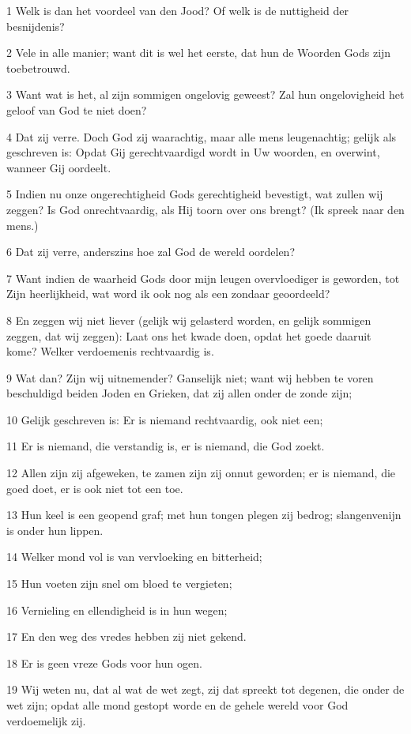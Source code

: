 \par 1 Welk is dan het voordeel van den Jood? Of welk is de nuttigheid der besnijdenis?
\par 2 Vele in alle manier; want dit is wel het eerste, dat hun de Woorden Gods zijn toebetrouwd.
\par 3 Want wat is het, al zijn sommigen ongelovig geweest? Zal hun ongelovigheid het geloof van God te niet doen?
\par 4 Dat zij verre. Doch God zij waarachtig, maar alle mens leugenachtig; gelijk als geschreven is: Opdat Gij gerechtvaardigd wordt in Uw woorden, en overwint, wanneer Gij oordeelt.
\par 5 Indien nu onze ongerechtigheid Gods gerechtigheid bevestigt, wat zullen wij zeggen? Is God onrechtvaardig, als Hij toorn over ons brengt? (Ik spreek naar den mens.)
\par 6 Dat zij verre, anderszins hoe zal God de wereld oordelen?
\par 7 Want indien de waarheid Gods door mijn leugen overvloediger is geworden, tot Zijn heerlijkheid, wat word ik ook nog als een zondaar geoordeeld?
\par 8 En zeggen wij niet liever (gelijk wij gelasterd worden, en gelijk sommigen zeggen, dat wij zeggen): Laat ons het kwade doen, opdat het goede daaruit kome? Welker verdoemenis rechtvaardig is.
\par 9 Wat dan? Zijn wij uitnemender? Ganselijk niet; want wij hebben te voren beschuldigd beiden Joden en Grieken, dat zij allen onder de zonde zijn;
\par 10 Gelijk geschreven is: Er is niemand rechtvaardig, ook niet een;
\par 11 Er is niemand, die verstandig is, er is niemand, die God zoekt.
\par 12 Allen zijn zij afgeweken, te zamen zijn zij onnut geworden; er is niemand, die goed doet, er is ook niet tot een toe.
\par 13 Hun keel is een geopend graf; met hun tongen plegen zij bedrog; slangenvenijn is onder hun lippen.
\par 14 Welker mond vol is van vervloeking en bitterheid;
\par 15 Hun voeten zijn snel om bloed te vergieten;
\par 16 Vernieling en ellendigheid is in hun wegen;
\par 17 En den weg des vredes hebben zij niet gekend.
\par 18 Er is geen vreze Gods voor hun ogen.
\par 19 Wij weten nu, dat al wat de wet zegt, zij dat spreekt tot degenen, die onder de wet zijn; opdat alle mond gestopt worde en de gehele wereld voor God verdoemelijk zij.
